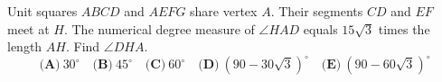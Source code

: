 Unit squares $ABCD$ and $AEFG$ share vertex $A$. Their segments $CD$ and $EF$ meet at $H$. The numerical degree measure of $\angle HAD$ equals $15\sqrt3$ times the length $AH$. Find $\angle DHA$.
\[\textbf{(A)}~30^\circ\quad\textbf{(B)}~45^\circ\quad\textbf{(C)}~60^\circ\quad\textbf{(D)}~(90-30\sqrt3)^\circ\quad\textbf{(E)}~(90-60\sqrt3)^\circ\]

